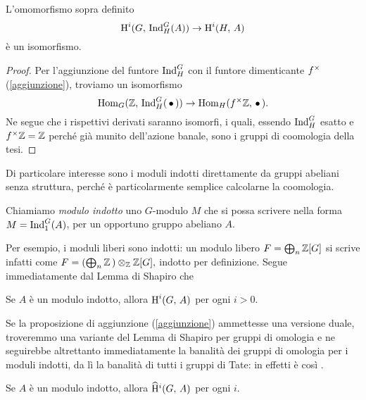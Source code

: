 \begin{lemma}[di Shapiro] \label{Shapiro}
	L'omomorfismo sopra definito
	\[ \operatorname{H}^i(G, \, \operatorname{Ind}_H^G(A)) \to \operatorname{H}^i(H, \, A) \]
	è un isomorfismo.
\end{lemma}
\begin{proof}
	Per l'aggiunzione del funtore $ \operatorname{Ind}_H^G $ con il funtore dimenticante $ f^\times $ (\ref{aggiunzione}), troviamo un isomorfismo
	\[ \operatorname{Hom}_G(\mathbb{Z},\, \operatorname{Ind}_H^G(\,\bullet\, )) \to \operatorname{Hom}_H(f^\times \mathbb{Z}, \, \bullet\, ). \]
	Ne segue che i rispettivi derivati saranno isomorfi, i quali, essendo $ \operatorname{Ind}_H^G $ esatto e $ f^\times\mathbb{Z} =\mathbb{Z} $ perché già munito dell'azione banale, sono i gruppi di coomologia della tesi.
\end{proof}

Di particolare interesse sono i moduli indotti direttamente da gruppi abeliani senza struttura, perché è particolarmente semplice calcolarne la coomologia.

\begin{definition}
	Chiamiamo \emph{modulo indotto} uno $ G $-modulo $ M $ che si possa scrivere nella forma $ M = \operatorname{Ind}_1^G(A) $, per un opportuno gruppo abeliano $ A $.
\end{definition}

Per esempio, i moduli liberi sono indotti: un modulo libero $ F = \bigoplus_n \mathbb{Z}[G] $ si scrive infatti come $ F = \left(\bigoplus_n\mathbb{Z}\,\right) \otimes_{\mathbb{Z}} \mathbb{Z}[G],  $ indotto per definizione.
Segue immediatamente dal Lemma di Shapiro che
\begin{corollary}
	Se $ A $ è un modulo indotto, allora $ \operatorname{H}^i(G, \, A) $ per ogni $ i > 0 $.
\end{corollary}

Se la proposizione di aggiunzione (\ref{aggiunzione}) ammettesse una versione duale, troveremmo una variante del Lemma di Shapiro per gruppi di omologia e ne seguirebbe altrettanto immediatamente la banalità dei gruppi di omologia per i moduli indotti, da lì la banalità di tutti i gruppi di Tate: in effetti è così \cite[lemma 6.3.2]{Weibel}. 
\begin{corollary}\label{indotti}
	Se $ A $ è un modulo indotto, allora $ \operatorname{\widehat{H}^\mathnormal{i}}(G, \, A) $ per ogni $ i $.
\end{corollary}

